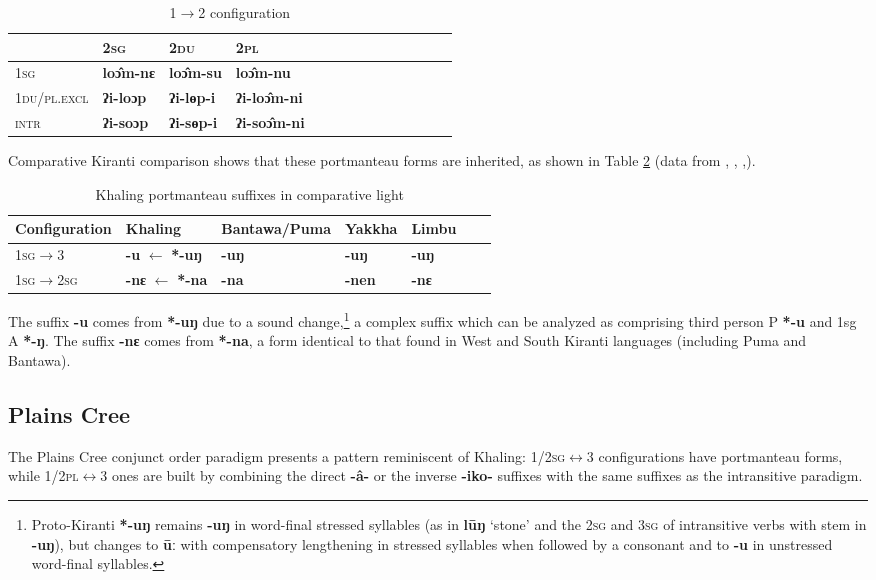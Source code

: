 \documentclass{article}
\newcommand{\ipa}[1]{{\phon\textbf{#1}}}
\newcommand{\bleu}[1]{\cellcolor{blue!30}\textbf{#1}}
\begin{document}
\begin{table}[H]
\caption{1$\rightarrow$2 configuration} \label{tab:loc} \centering
\begin{tabular}{llllllllllllll}
 \toprule
  &	\textsc{2sg} &	\textsc{2du} &	\textsc{2pl} &	\\
   \midrule
\textsc{1sg} &	\ipa{loɔ̂m-nɛ} \bleu{}&	\ipa{loɔ̂m-su} \bleu{}&	\ipa{loɔ̂m-nu} \bleu{}&	\\
\textsc{1du/pl.excl }&	\ipa{ʔi-loɔp} &	\ipa{ʔi-lɵp-i} &	\ipa{ʔi-loɔ̂m-ni} &	\\
\textsc{intr} &	\ipa{ʔi-soɔp} &	\ipa{ʔi-sɵp-i} &	\ipa{ʔi-soɔ̂m-ni} &	\\
 \bottomrule
\end{tabular}
\end{table}

Comparative Kiranti comparison shows that these portmanteau forms are inherited, as shown in Table \ref{tab:kiranti} (data from \citealt{driem87}, \citealt{doornenbal09},  \citealt{bickel07puma},\citealt{schackow15yakkha}). 


\begin{table}[H]
\caption{Khaling portmanteau suffixes in comparative light} \label{tab:kiranti} \centering
\begin{tabular}{lllllll}
\toprule
Configuration &  Khaling & Bantawa/Puma & Yakkha& Limbu \\
\midrule
\textsc{1sg$\rightarrow$3} & \ipa{-u} $\leftarrow$ \ipa{*-uŋ} & \ipa{-uŋ} & \ipa{-uŋ} &\ipa{-uŋ} \\
\textsc{1sg$\rightarrow$2sg} &  \ipa{-nɛ} $\leftarrow$ \ipa{*-na} &  \ipa{-na} &  \ipa{-nen} & \ipa{-nɛ} & \\
 \bottomrule
\end{tabular}
\end{table}

The suffix \ipa{-u} comes from \ipa{*-uŋ} due to a sound change,\footnote{Proto-Kiranti \ipa{*-uŋ} remains \ipa{-uŋ} in word-final stressed syllables (as in \ipa{lūŋ} `stone' and the \textsc{2sg} and \textsc{3sg} of intransitive verbs with stem in \ipa{-uŋ}), but changes to \ipa{ūː} with compensatory lengthening in stressed syllables when followed by a consonant and to \ipa{-u} in unstressed word-final syllables. } a complex suffix which can be analyzed as comprising third person P \ipa{*-u} and 1sg A \ipa{*-ŋ}. The suffix \ipa{-nɛ} comes from \ipa{*-na}, a form identical to that found in West and South Kiranti languages (including Puma and Bantawa).


\subsection{Plains Cree} \label{sec:cree}
The Plains Cree conjunct order paradigm presents  a pattern reminiscent of Khaling: 1/\textsc{2sg$\leftrightarrow$3} configurations have portmanteau forms, while 1/\textsc{2pl$\leftrightarrow$3} ones are built by combining the direct \ipa{-â-} or the inverse \ipa{-iko-} suffixes with the same suffixes as the intransitive paradigm.
\end{document}
